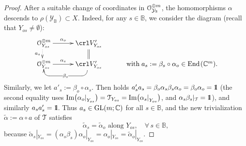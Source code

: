 \documentclass[11pt,reqno]{amsart}
\let\euf\EuScript
\let\cal\mathcal
\let\mbb\mathbb
\let\nit\noindent
\numberwithin{equation}{section}
\numberwithin{figure}{section}
\begin{document}
\begin{proof}
\nit{\it Claim}\quad After a suitable change of coordinates 
in ${{\euf O}}_{{{\cal Y}}_{{\mbb B}}}^{\oplus m}$, the homomorphisms $\alpha$ descends to 
$\rho({{\cal Y}}_{{\mbb B}})\subset X$. Indeed, for any $s\in{{\mbb B}}$, we consider the diagram 
(recall that $Y_{os}\neq\emptyset$):
$$
\xymatrix@C=3em@R=1.25em{
\kern1ex{{\euf O}}_{Y_{os}}^{\oplus m}\ar[r]^-{\alpha_o}\ar@{..>}[d]_-{a_s}
&
\crl V'_{Y_{os}}\ar@{=}[d]
&
\\ 
\kern1ex{{\euf O}}_{Y_{os}}^{\oplus m}\ar[r]^-{\alpha_s}
&
\crl V'_{Y_{os}}\ar@<-2pt>`d[l] `[l]|-{\beta_s}
&
\text{with}\;
a_s:=\beta_s\circ\alpha_o\in{\operatorname{\rm{End}\kern1pt}}(\mbb C^m).
}
$$
Similarly, we let $a'_s:=\beta_o\circ\alpha_s$. Then holds 
$a'_sa_s=\beta_o\alpha_s\beta_s\alpha_o=\beta_o\alpha_o={{1\kern-0.57ex\rm l}}$ 
(the second equality uses 
${{\rm Im}}\bigl({\alpha_o|}_{Y_{os}}\bigr)
={{\euf T}}_{Y_{os}}={{\rm Im}}\bigl({\alpha_s|}_{Y_{os}}\bigr)$, 
and $\alpha_s\beta_s|_{{\euf T}}={{1\kern-0.57ex\rm l}}$), and similarly $a_sa'_s={{1\kern-0.57ex\rm l}}$. 
Thus $a_s\in{{\rm GL}}(m;\mbb C)$ for all $s\in{{\mbb B}}$, and the new trivialization 
$\tilde\alpha:=\alpha\circ a$ of ${{\euf T}}$ satisfies  
\begin{equation}\label{eq:os}
\tilde\alpha_s=\tilde\alpha_o\text{ along }Y_{os},
\quad\forall\,s\in{{\mbb B}}, 
\end{equation}
because 
$\tilde\alpha_s|_{Y_{os}}{=}(\alpha_s\beta_s)\alpha_o|_{Y_{os}}
{=}\alpha_o|_{Y_{os}}{=}\tilde\alpha_o|_{Y_{os}}$. 


\end{proof}
\end{document}
